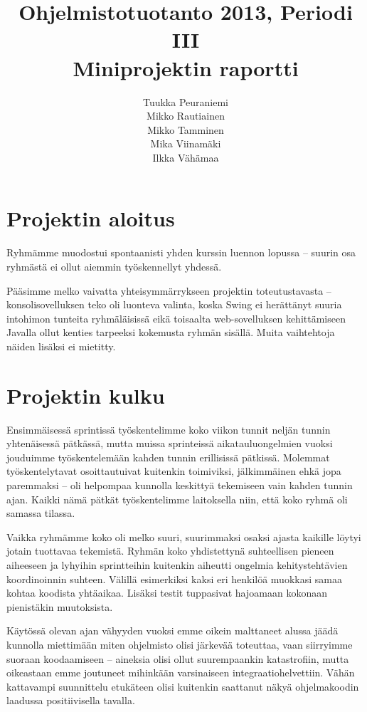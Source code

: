 \documentclass{article}
\title{Ohjelmistotuotanto 2013, Periodi III \\ Miniprojektin raportti}
\author{Tuukka Peuraniemi \\ Mikko Rautiainen \\ Mikko Tamminen \\ Mika Viinamäki \\ Ilkka Vähämaa}
\begin{document}
\begin{titlepage}
\maketitle
\end{titlepage}

\section{Projektin aloitus}

Ryhmämme muodostui spontaanisti yhden kurssin luennon lopussa -- suurin osa ryhmästä ei ollut aiemmin työskennellyt yhdessä.

Pääsimme melko vaivatta yhteisymmärrykseen projektin toteutustavasta -- konsolisovelluksen teko oli luonteva valinta, koska Swing ei herättänyt suuria intohimon tunteita ryhmäläisissä eikä toisaalta web-sovelluksen kehittämiseen Javalla ollut kenties tarpeeksi kokemusta ryhmän sisällä. Muita vaihtehtoja näiden lisäksi ei mietitty.

\section{Projektin kulku}

Ensimmäisessä sprintissä työskentelimme koko viikon tunnit neljän tunnin yhtenäisessä pätkässä, mutta muissa sprinteissä aikatauluongelmien vuoksi jouduimme työskentelemään kahden tunnin erillisissä pätkissä. Molemmat työskentelytavat osoittautuivat kuitenkin toimiviksi, jälkimmäinen ehkä jopa paremmaksi -- oli helpompaa kunnolla keskittyä tekemiseen vain kahden tunnin ajan. Kaikki nämä pätkät työskentelimme laitoksella niin, että koko ryhmä oli samassa tilassa.

Vaikka ryhmämme koko oli melko suuri, suurimmaksi osaksi ajasta kaikille löytyi jotain tuottavaa tekemistä. Ryhmän koko yhdistettynä suhteellisen pieneen aiheeseen ja lyhyihin sprintteihin kuitenkin aiheutti ongelmia kehitystehtävien koordinoinnin suhteen. Välillä esimerkiksi kaksi eri henkilöä muokkasi samaa kohtaa koodista yhtäaikaa. Lisäksi testit tuppasivat hajoamaan kokonaan pienistäkin muutoksista.

Käytössä olevan ajan vähyyden vuoksi emme oikein malttaneet alussa jäädä kunnolla miettimään miten ohjelmisto olisi järkevää toteuttaa, vaan siirryimme suoraan koodaamiseen -- aineksia olisi ollut suurempaankin katastrofiin, mutta oikeastaan emme joutuneet mihinkään varsinaiseen integraatiohelvettiin. Vähän kattavampi suunnittelu etukäteen olisi kuitenkin saattanut näkyä ohjelmakoodin laadussa positiivisella tavalla.
\end{document}

